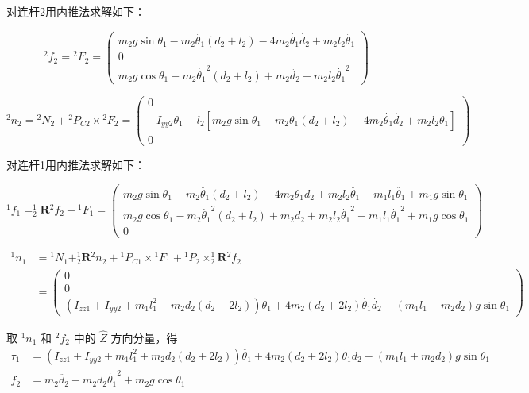 \documentclass{homework}
\begin{document}
\begin{sol}
对连杆2用内推法求解如下：

\[
 {^2}f_2 = {^2}F_2 =
 \begin{pmatrix}
    m_2 g \sin\theta_1 - m_2 \ddot{\theta_1} (d_2 + l_2) - 4 m_2 \dot{\theta_1} \dot{d_2} + m_2 l_2 \ddot{\theta_1} \\
    0 \\
    m_2 g \cos\theta_1 - m_2 \dot{\theta_1}^2 (d_2 + l_2) + m_2 \ddot{d_2} + m_2 l_2 \dot{\theta_1}^2
  \end{pmatrix}
\]

\[
  {^2}n_2 = {^2}N_2 + {^2}P_{C2} \times {^2}F_2 =
  \begin{pmatrix}
    0 \\
    -I_{yy2} \ddot{\theta_1} - l_2 [m_2 g \sin\theta_1 - m_2 \ddot{\theta_1} (d_2 + l_2) - 4 m_2 \dot{\theta_1} \dot{d_2} + m_2 l_2 \ddot{\theta_1}] \\
    0 
  \end{pmatrix}
\]

对连杆1用内推法求解如下：

\[
  {^1}f_1 = _2^1\mathbf{R} {^2}f_2 + {^1}F_1 =
  \begin{pmatrix}
    m_2 g \sin\theta_1 - m_2 \ddot{\theta_1} (d_2 + l_2) - 4 m_2 \dot{\theta_1} \dot{d_2} + m_2 l_2 \ddot{\theta_1} - m_1 l_1 \ddot{\theta_1} + m_1 g \sin\theta_1 \\
    m_2 g \cos\theta_1 - m_2 \dot{\theta_1}^2 (d_2 + l_2) + m_2 \ddot{d_2} + m_2 l_2 \dot{\theta_1}^2 - m_1 l_1 \dot{\theta_1}^2 + m_1 g \cos\theta_1 \\
    0 
  \end{pmatrix}
\]

\begin{align*}
  {^1}n_1 &= {^1}N_1 + _2^1\mathbf{R} {^2}n_2 + {^1}P_{C1} \times {^1}F_1 + {^1}P_2 \times _2^1\mathbf{R} {^2}f_2 \\
  &=
  \begin{pmatrix}
    0 \\
    0 \\
    \left( I_{zz1} + I_{yy2} + m_1 l_1^2 + m_2 d_2 (d_2 + 2 l_2) \right) \ddot{\theta_1} + 4 m_2 (d_2 + 2 l_2) \dot{\theta_1} \dot{d_2} - (m_1 l_1 + m_2 d_2) g \sin\theta_1
  \end{pmatrix}
\end{align*}

取 $ {^1}n_1 $ 和 $ {^2}f_2 $ 中的 $ \hat{Z} $ 方向分量，得
\begin{align*}
  \tau_1 &= \left( I_{zz1} + I_{yy2} + m_1 l_1^2 + m_2 d_2 (d_2 + 2 l_2) \right) \ddot{\theta_1} + 4 m_2 (d_2 + 2 l_2) \dot{\theta_1} \dot{d_2} - (m_1 l_1 + m_2 d_2) g \sin\theta_1 \\
  f_2 &= m_2 \ddot{d_2} - m_2 d_2 \dot{\theta_1}^2 + m_2 g \cos\theta_1
\end{align*}

\end{sol}
\end{document}
